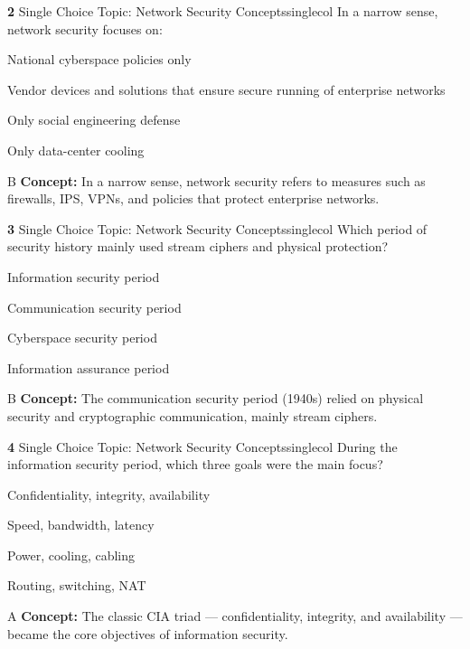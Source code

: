 \documentclass[10pt,a4paper]{article}
\begin{document}
\begin{qcard}{\color{white}\textbf{2} \hfill \small Single Choice \textbar{} Topic: Network Security Concepts}{singlecol}
In a narrow sense, network security focuses on:

\begin{qoptions}
\item National cyberspace policies only
\item Vendor devices and solutions that ensure secure running of enterprise networks
\item Only social engineering defense
\item Only data-center cooling
\end{qoptions}
\begin{explainbox}{B}
\textbf{Concept:} In a narrow sense, network security refers to measures such as firewalls, IPS, VPNs, and policies that protect enterprise networks.
\end{explainbox}
\end{qcard}

\begin{qcard}{\color{white}\textbf{3} \hfill \small Single Choice \textbar{} Topic: Network Security Concepts}{singlecol}
Which period of security history mainly used stream ciphers and physical protection?

\begin{qoptions}
\item Information security period
\item Communication security period
\item Cyberspace security period
\item Information assurance period
\end{qoptions}
\begin{explainbox}{B}
\textbf{Concept:} The communication security period (1940s) relied on physical security and cryptographic communication, mainly stream ciphers.
\end{explainbox}
\end{qcard}

\begin{qcard}{\color{white}\textbf{4} \hfill \small Single Choice \textbar{} Topic: Network Security Concepts}{singlecol}
During the information security period, which three goals were the main focus?

\begin{qoptions}
\item Confidentiality, integrity, availability
\item Speed, bandwidth, latency
\item Power, cooling, cabling
\item Routing, switching, NAT
\end{qoptions}
\begin{explainbox}{A}
\textbf{Concept:} The classic CIA triad — confidentiality, integrity, and availability — became the core objectives of information security.
\end{explainbox}
\end{qcard}
\end{document}

